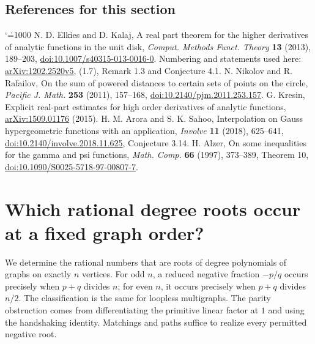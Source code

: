 \documentclass[11pt,a4paper]{article}
\makeatletter
\numberwithin{equation}{section}
\theoremstyle{definition}
\theoremstyle{remark}
\newenvironment{sectionabstract}{\par\smallskip\begingroup\small\noindent}{\par\endgroup\medskip}
\renewenvironment{thebibliography}[1]
 {\subsection*{References for this section}\small
  \list{\@biblabel{\@arabic\c@enumiv}}
       {\settowidth\labelwidth{\@biblabel{#1}}\leftmargin\labelwidth
        \advance\leftmargin\labelsep\@openbib@code
        \usecounter{enumiv}\let\p@enumiv\@empty
        \renewcommand\theenumiv{\@arabic\c@enumiv}}
  \sloppy\clubpenalty4000\widowpenalty4000\sfcode`\.=1000\relax}
 {\def\@noitemerr{\@latex@warning{Empty bibliography}}\endlist}
\makeatother
\begin{document}
\begin{thebibliography}{9}
 N. D. Elkies and D. Kalaj, A real part theorem for the higher derivatives of analytic functions in the unit disk, \emph{Comput. Methods Funct. Theory} \textbf{13} (2013), 189--203, \href{https://doi.org/10.1007/s40315-013-0016-0}{doi:10.1007/s40315-013-0016-0}. Numbering and statements used here: \href{https://arxiv.org/pdf/1202.2520}{arXiv:1202.2520v5}, (1.7), Remark 1.3 and Conjecture 4.1.
 N. Nikolov and R. Rafailov, On the sum of powered distances to certain sets of points on the circle, \emph{Pacific J. Math.} \textbf{253} (2011), 157--168, \href{https://doi.org/10.2140/pjm.2011.253.157}{doi:10.2140/pjm.2011.253.157}.
 G. Kresin, Explicit real-part estimates for high order derivatives of analytic functions, \href{https://arxiv.org/abs/1509.01176}{arXiv:1509.01176} (2015).
 H. M. Arora and S. K. Sahoo, Interpolation on Gauss hypergeometric functions with an application, \emph{Involve} \textbf{11} (2018), 625--641, \href{https://doi.org/10.2140/involve.2018.11.625}{doi:10.2140/involve.2018.11.625}, Conjecture 3.14.
 H. Alzer, On some inequalities for the gamma and psi functions, \emph{Math. Comp.} \textbf{66} (1997), 373--389, Theorem 10, \href{https://doi.org/10.1090/S0025-5718-97-00807-7}{doi:10.1090/S0025-5718-97-00807-7}.
\end{thebibliography}

\par\endgroup

\begingroup

\section{\texorpdfstring{Which rational degree roots occur at a fixed graph order?}{Which rational degree roots occur at a fixed graph order?}}\label{section:r31reiwa}
\par\medskip


\begin{sectionabstract}
We determine the rational numbers that are roots of degree polynomials of
graphs on exactly $n$ vertices. For odd $n$, a reduced negative fraction
$-p/q$ occurs precisely when $p+q$ divides $n$; for even $n$, it occurs
precisely when $p+q$ divides $n/2$. The classification is the same for
loopless multigraphs. The parity obstruction comes from differentiating
the primitive linear factor at $1$ and using the handshaking identity.
Matchings and paths suffice to realize every permitted negative root.
\end{sectionabstract}
\end{document}
